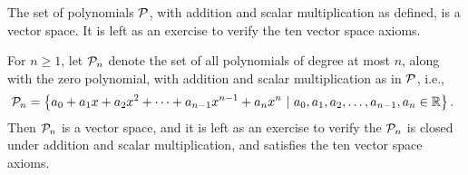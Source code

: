 \documentclass[pdf,9pt]{beamer}
\begin{document}
\begin{frame}[fragile]
\begin{example}
  The set of polynomials $\cal P$, with addition and scalar
  multiplication as defined, is a vector space.
  It is left as an exercise to verify the ten vector space axioms.
\end{example}
\vfill
\pause
\begin{example}
  For $n\geq 1$, let ${\cal P}_n$ denote the set of all polynomials
  of degree at most $n$, along with the zero polynomial,
  with addition and scalar multiplication as in $\cal P$,
  i.e.,
  \[\hspace{-0.5em} {\cal P}_n
    =\left\{ a_0 + a_1x + a_2x^2 + \cdots + a_{n-1}x^{n-1} +a_nx^n ~|~ a_0, a_1, a_2, \ldots, a_{n-1}, a_n\in\mathbb{R}\right\}.\]
  Then ${\cal P}_n$ is a vector space, and it is left as an
  exercise to verify the ${\cal P}_n$ is closed under addition
  and scalar multiplication, and satisfies the ten vector space
  axioms.
\end{example}
\end{frame}
\end{document}
